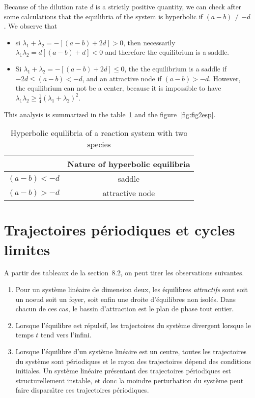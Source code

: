 {Because of the dilution rate $d$ is a strictly positive quantity, we can check after some calculations that the equilibria of the system is hyperbolic if $(a-b) \neq -d$. We observe that
\begin{itemize}
\item si $\lambda_1 + \lambda_2 = -[(a-b)+2d]>0$, then necessarily
$\lambda_1 \lambda_2 = d[(a-b)+d]<0$ and therefore the equilibrium is a saddle.
\item Si $\lambda_1 + \lambda_2 = -[(a-b)+2d]\leq 0$, the the equilibrium is a saddle
if $-2d\leq(a-b)<-d$, and an attractive node if $(a-b)>-d$.  However, the equilibrium can not be a center, because it is impossible to have
$\lambda_1 \lambda_2 \geq \frac{1}{4} (\lambda_1 + \lambda_2)^2$.
\end{itemize}
This analysis is summarized in the table~\ref{tab2esp} and the figure~\ref{fig:fig2esp}.

\begin{table}
\hspace*{10mm}
\renewcommand{\arraystretch}{3.0}
\begin{tabular}{|c|c|}
\hline
&
Nature of hyperbolic equilibria\\ \hline
$(a-b)<-d$&saddle \\ \hline
$(a-b)>-d$&attractive node\\ \hline
\end{tabular}
\caption{Hyperbolic equilibria of a reaction system with two species}
\label{tab2esp}
\end{table}

\section{Trajectoires p{é}riodiques et cycles limites}

A partir des tableaux de la section~8.2, on peut tirer les
observations suivantes.
\begin{enumerate}
\item Pour un syst{è}me lin{é}aire de dimension deux, les équilibres {\em
attractifs} sont soit un noeud  soit un foyer, soit enfin une droite d'{é}quilibres non isol{é}s. Dans
chacun de ces cas, le bassin d'attraction est le plan de phase tout entier.
\item Lorsque l'{é}quilibre est r{é}pulsif, les trajectoires du
syst{è}me divergent lorsque le temps $t$ tend vers l'infini.
\item Lorsque l'{é}quilibre d'un syst{è}me lin{é}aire est un centre, toutes
les trajectoires du syst{è}me sont p{é}riodiques et le rayon des 
trajectoires d{é}pend des conditions initiales.
Un syst{è}me lin{é}aire pr{é}sentant des trajectoires p{é}riodiques
est structurellement instable, et donc la moindre perturbation du syst{è}me
peut faire dispara\^ \i tre ces trajectoires p{é}riodiques. 
\end{enumerate}

}
